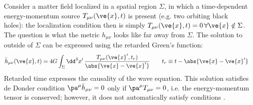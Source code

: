 Consider a matter field localized in a spatial region $ \Sigma $, in which a time-dependent energy-momentum source $ T_{\mu \nu}(\ve{x},t) $ is present (e.g. two orbiting black holes): the localization condition then is simply $ T_{\mu \nu}(\ve{x},t) = 0 \,\forall \ve{x} \notin \Sigma $. The question is what the metric $ h_{\mu \nu} $ looks like far away from $ \Sigma $. The solution to  outside of $ \Sigma $ can be expressed using the retarded Green's function:
\begin{equation}
  \bar{h}_{\mu \nu}(\ve{x},t) = 4G \int_\Sigma \dd^3 x'\, \frac{T_{\mu \nu}(\ve{x}',t_r)}{\abs{\ve{x} - \ve{x}'}}
  \qquad t_r \equiv t - \abs{\ve{x} - \ve{x}'}
\end{equation}
Retarded time expresses the causality of the wave equation. This solution satisfies de Donder condition $ \pa^\mu \bar{h}_{\mu \nu} = 0 $ only if $ \pa^\mu T_{\mu \nu} = 0 $, i.e. the energy-momentum tensor is conserved; however, it does not automatically satisfy conditions .

